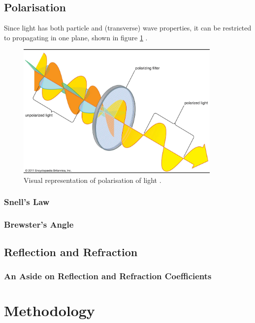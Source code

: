 \documentclass[12pt]{article}
\begin{document}
\subsection{Polarisation}

Since light has both particle and (transverse) wave properties, it can be restricted to propagating in one plane, shown in figure \ref{fig:polar}
\cite{isaacpolar,britpolar}.

\begin{figure}[H]
    \centering
    \includegraphics[width=10cm]{polarisation.png}
    \caption{\centering Visual representation of polarisation of light \protect\cite{britpolar}.}
    \label{fig:polar}
\end{figure}

\subsubsection{Snell's Law}



\subsubsection{Brewster's Angle}



\subsection{Reflection and Refraction}



\subsubsection{An Aside on Reflection and Refraction Coefficients}



\section{Methodology} 
\end{document}
